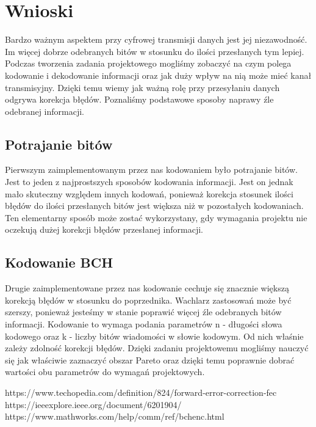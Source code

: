 \documentclass[12pt,a4paper,notitlepage]{report}
\begin{document}
    \chapter{Wnioski}
    Bardzo ważnym aspektem przy cyfrowej transmisji danych jest jej niezawodność. Im więcej dobrze odebranych bitów w stosunku do ilości przesłanych tym lepiej. Podczas tworzenia zadania projektowego mogliśmy zobaczyć na czym polega kodowanie i dekodowanie informacji oraz jak duży wpływ na nią może mieć kanał transmisyjny. Dzięki temu wiemy jak ważną rolę przy przesyłaniu danych odgrywa korekcja błędów. Poznaliśmy podstawowe sposoby naprawy źle odebranej informacji.
    \section{Potrajanie bitów}
    Pierwszym zaimplementowanym przez nas kodowaniem było potrajanie bitów. Jest to jeden z najprostszych sposobów kodowania informacji. Jest on jednak mało skuteczny względem innych kodowań, ponieważ korekcja stosunek ilości błędów do ilości przesłanych bitów jest większa niż w pozostałych kodowaniach. Ten elementarny sposób może zostać wykorzystany, gdy wymagania projektu nie oczekują dużej korekcji błędów przesłanej informacji.
    \section{Kodowanie BCH}
    Drugie zaimplementowane przez nas kodowanie cechuje się znacznie większą korekcją błędów w stosunku do poprzednika. Wachlarz zastosowań może być szerszy, ponieważ jesteśmy w stanie poprawić więcej źle odebranych bitów informacji. Kodowanie to wymaga podania parametrów n - długości słowa kodowego oraz k - liczby bitów wiadomości w słowie kodowym. Od nich właśnie zależy zdolność korekcji błędów. Dzięki zadaniu projektowemu mogliśmy nauczyć się jak właściwie zaznaczyć obszar Pareto oraz dzięki temu poprawnie dobrać wartości obu parametrów do wymagań projektowych.
    \begin{thebibliography}{Knuth}
         {https://www.techopedia.com/definition/824/forward-error-correction-fec}
         {https://ieeexplore.ieee.org/document/6201904/}
         {https://www.mathworks.com/help/comm/ref/bchenc.html}
    \end{thebibliography}
\end{document}
